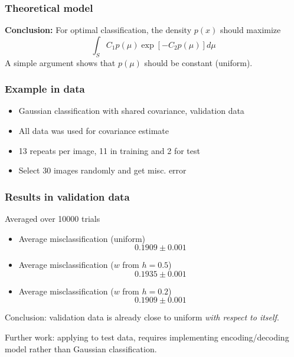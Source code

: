 \documentclass{beamer}
\begin{document}
\begin{frame}
\frametitle{Theoretical model}
\textbf{Conclusion: }
For optimal classification, the density $p(x)$ should maximize
\[
\int_S C_1 p(\mu)\exp[-C_2 p(\mu)] d\mu
\]
A simple argument shows that $p(\mu)$ should be constant (uniform).
\end{frame}

\begin{frame}
\frametitle{Example in data}
\begin{itemize}
\item Gaussian classification with shared covariance, validation data
\item All data was used for covariance estimate
\item 13 repeats per image, 11 in training and 2 for test
\item Select 30 images randomly and get misc. error
\end{itemize}
\end{frame}

\begin{frame}
\frametitle{Results in validation data}
Averaged over 10000 trials
\begin{itemize}
\item Average misclassification (uniform)
\[0.1909 \pm 0.001\]
\item Average misclassification ($w$ from $h = 0.5$)
\[0.1935 \pm 0.001\]
\item Average misclassification ($w$ from $h = 0.2$)
\[0.1909 \pm 0.001\]
\end{itemize}

Conclusion: validation data is already close to uniform \emph{with
  respect to itself}.

Further work: applying to test data, requires implementing
encoding/decoding model rather than Gaussian classification.
\end{frame}
\end{document}
